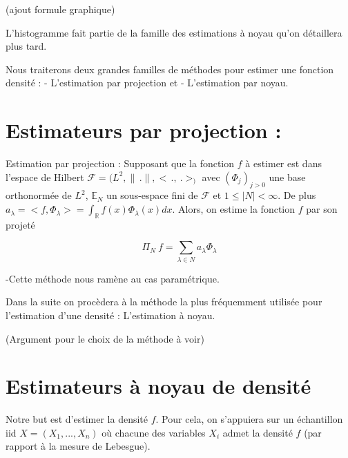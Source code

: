 \documentclass[
]{book}
\begin{document}
(ajout formule graphique)

L'histogramme fait partie de la famille des estimations à noyau qu'on détaillera plus tard.

Nous traiterons deux grandes familles de méthodes pour estimer une fonction densité : \newline
\hspace*{0.5cm} - L'estimation par projection et
\hspace*{0.5cm} - L'estimation par noyau.

\hypertarget{estimateurs-par-projection}{%
\section{Estimateurs par projection :}\label{estimateurs-par-projection}}

\begin{dfn}
Estimation par projection : \newline
Supposant que la fonction $f$ à estimer est dans l'espace de Hilbert
$\mathcal F = (L^2 , \parallel\,.\parallel, <\,.,~.>_)$ avec $(\Phi_j)_{j>0}$ une base orthonormée de $L^2$, $\mathbb E _N$  un sous-espace fini de $\mathcal F$ et $1 \leq |N| < \infty$.\newline
De plus $a_{\lambda} = <f,\Phi_{\lambda}> = \int_{\mathbb R}f(x)\Phi_{\lambda}(x) dx$.\newline
Alors, on estime la fonction $f$ par son projeté 

$$
\Pi_N~f = \sum_{\lambda \in N} a_{\lambda} \Phi_{\lambda}
$$
\end{dfn}

\begin{rem}
-Cette méthode nous ramène au cas paramétrique.\newline
\end{rem}

Dans la suite on procèdera à la méthode la plus fréquemment utilisée pour l'estimation d'une densité : L'estimation à noyau.\newline 

(Argument pour le choix de la méthode à voir)

\hypertarget{estimateurs-uxe0-noyau-de-densituxe9}{%
\section{Estimateurs à noyau de densité}\label{estimateurs-uxe0-noyau-de-densituxe9}}

Notre but est d'estimer la densité \(f\). Pour cela, on s'appuiera sur un échantillon iid \(X= (X_1,...,X_n)\) où chacune des variables \(X_i\) admet la densité \(f\) (par rapport à la mesure de Lebesgue).
\end{document}
